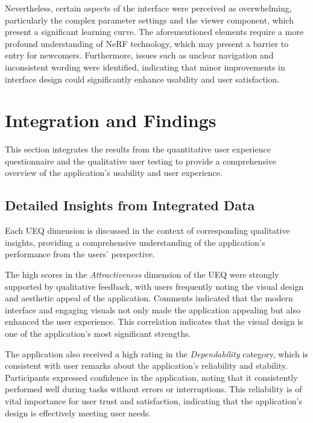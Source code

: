 Nevertheless, certain aspects of the interface were perceived as overwhelming, particularly the complex parameter settings and the viewer component, which present a significant learning curve.
The aforementioned elements require a more profound understanding of NeRF technology, which may present a barrier to entry for newcomers.
Furthermore, issues such as unclear navigation and inconsistent wording were identified, indicating that minor improvements in interface design could significantly enhance usability and user satisfaction.

\section{Integration and Findings}
\label{sec:result:findings}

This section integrates the results from the quantitative user experience questionnaire and the qualitative user testing to provide a comprehensive overview of the application's usability and user experience.

\subsection*{Detailed Insights from Integrated Data}
\label{subsec:findings:detailed_insights}
Each UEQ dimension is discussed in the context of corresponding qualitative insights, providing a comprehensive understanding of the application’s performance from the users' perspective.

The high scores in the \emph{Attractiveness} dimension of the UEQ were strongly supported by qualitative feedback, with users frequently noting the visual design and aesthetic appeal of the application. 
Comments indicated that the modern interface and engaging visuals not only made the application appealing but also enhanced the user experience. 
This correlation indicates that the visual design is one of the application's most significant strengths.

The application also received a high rating in the \emph{Dependability} category, which is consistent with user remarks about the application’s reliability and stability.
Participants expressed confidence in the application, noting that it consistently performed well during tasks without errors or interruptions. 
This reliability is of vital importance for user trust and satisfaction, indicating that the application’s design is effectively meeting user needs.

